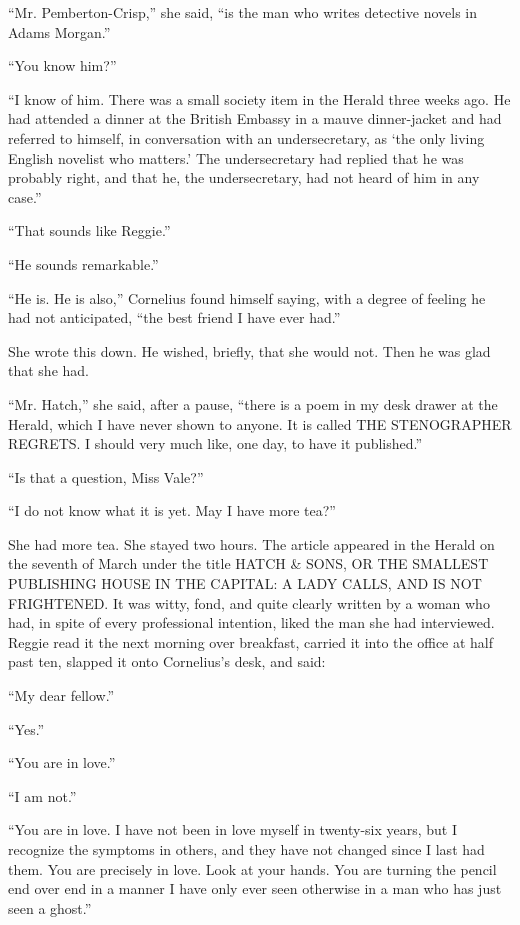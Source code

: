 \documentclass[12pt,openright]{book}
\begin{document}
“Mr. Pemberton-Crisp,” she said, “is the man who writes detective novels in Adams Morgan.”

“You know him?”

“I know of him. There was a small society item in the Herald three weeks ago. He had attended a dinner at the British Embassy in a mauve dinner-jacket and had referred to himself, in conversation with an undersecretary, as ‘the only living English novelist who matters.’ The undersecretary had replied that he was probably right, and that he, the undersecretary, had not heard of him in any case.”

“That sounds like Reggie.”

“He sounds remarkable.”

“He is. He is also,” Cornelius found himself saying, with a degree of feeling he had not anticipated, “the best friend I have ever had.”

She wrote this down. He wished, briefly, that she would not. Then he was glad that she had.

“Mr. Hatch,” she said, after a pause, “there is a poem in my desk drawer at the Herald, which I have never shown to anyone. It is called THE STENOGRAPHER REGRETS. I should very much like, one day, to have it published.”

“Is that a question, Miss Vale?”

“I do not know what it is yet. May I have more tea?”

She had more tea. She stayed two hours. The article appeared in the Herald on the seventh of March under the title HATCH \& SONS, OR THE SMALLEST PUBLISHING HOUSE IN THE CAPITAL: A LADY CALLS, AND IS NOT FRIGHTENED. It was witty, fond, and quite clearly written by a woman who had, in spite of every professional intention, liked the man she had interviewed. Reggie read it the next morning over breakfast, carried it into the office at half past ten, slapped it onto Cornelius’s desk, and said:

“My dear fellow.”

“Yes.”

“You are in love.”

“I am not.”

“You are in love. I have not been in love myself in twenty-six years, but I recognize the symptoms in others, and they have not changed since I last had them. You are precisely in love. Look at your hands. You are turning the pencil end over end in a manner I have only ever seen otherwise in a man who has just seen a ghost.”
\end{document}
